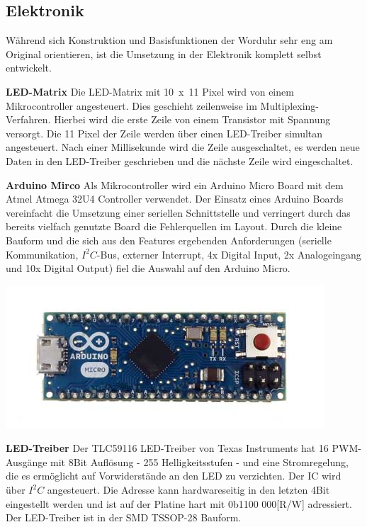 \begin{multicols}{2}
\section{Elektronik}
\label{sec:Elektronik}
Während sich Konstruktion und Basisfunktionen der Worduhr sehr eng am Original orientieren, ist die Umsetzung in der Elektronik komplett selbst entwickelt.

\textbf{LED-Matrix} Die LED-Matrix mit 10~x~11 Pixel wird von einem Mikrocontroller angesteuert. Dies geschieht zeilenweise im Multiplexing-Verfahren. Hierbei wird die erste Zeile von einem Transistor mit Spannung versorgt. Die 11 Pixel der Zeile werden über einen LED-Treiber simultan angesteuert. Nach einer Millisekunde wird die Zeile ausgeschaltet, es werden neue Daten in den LED-Treiber geschrieben und die nächste Zeile wird eingeschaltet. 

\textbf{Arduino Mirco} Als Mikrocontroller wird ein Arduino Micro Board mit dem Atmel Atmega 32U4 Controller verwendet. Der Einsatz eines Arduino Boards vereinfacht die Umsetzung einer seriellen Schnittstelle und verringert durch das bereits vielfach genutzte Board die Fehlerquellen im Layout. Durch die kleine Bauform und die sich aus den Features ergebenden Anforderungen (serielle Kommunikation, $I^{2}C$-Bus, externer Interrupt, 4x Digital Input, 2x Analogeingang und 10x Digital Output) fiel die Auswahl auf den Arduino Micro.

\includegraphics[width=\columnwidth]{Abbildungen/Elektronik/ArduinoMicro}

\textbf{LED-Treiber} Der TLC59116 LED-Treiber von Texas Instruments hat 16 PWM-Ausgänge mit 8Bit Auflösung - 255 Helligkeitsstufen - und eine Stromregelung, die es ermöglicht auf Vorwiderstände an den LED zu verzichten. Der IC wird über $I^{2}C$ angesteuert. Die Adresse kann hardwareseitig in den letzten 4Bit eingestellt werden und ist auf der Platine hart mit 0b1100 000[R/W] adressiert. Der LED-Treiber ist in der SMD TSSOP-28 Bauform.



\end{multicols}
